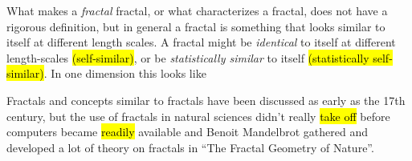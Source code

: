 What makes a \emph{fractal} fractal, or what characterizes a fractal, does not have a rigorous definition, but in general a fractal is something that looks similar to itself at different length scales. A fractal might be \emph{identical} to itself at different length-scales \hl{(self-similar)}, or be \emph{statistically similar} to itself \hl{(statistically self-similar)}. In one dimension this looks like 

Fractals and concepts similar to fractals have been discussed as early as the 17th century, but the use of fractals in natural sciences didn't really \hl{take off} before computers became \hl{readily} available and Benoit Mandelbrot gathered and developed a lot of theory on fractals in ``The Fractal Geometry of Nature''\cite{mandelbrot1983fractal}. 


% 
% 

